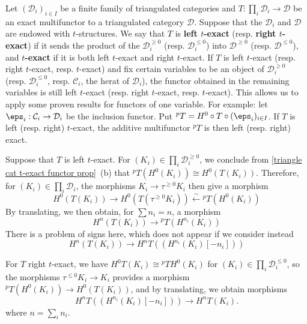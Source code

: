 Let $(\mathcal{D}_i)_{i\in I}$ be a finite family of triangulated categories and $T:\prod_i\mathcal{D}_i\to\mathcal{D}$ be an exact multifunctor to a triangulated category $\mathcal{D}$. Suppose that the $\mathcal{D}_i$ and $\mathcal{D}$ are endowed with $t$-structures. We say that $T$ is \textbf{left $t$-exact} (resp. \textbf{right $t$-exact}) if it sends the product of the $\mathcal{D}_i^{\geq 0}$ (resp. $\mathcal{D}_i^{\leq 0}$) into $\mathcal{D}^{\geq 0}$ (resp. $\mathcal{D}^{\leq 0}$), and \textbf{$t$-exact} if it is both left $t$-exact and right $t$-exact. If $T$ is left $t$-exact (resp. right $t$-exact, resp. $t$-exact) and fix certain variables to be an object of $\mathcal{D}_i^{\geq 0}$ (resp. $\mathcal{D}_i^{\leq 0}$, resp. $\mathcal{C}_i$, the herat of $\mathcal{D}_i$), the functor obtained in the remaining variables is still left $t$-exact (resp. right $t$-exact, resp. $t$-exact). This allows us to apply some proven results for functors of one variable. For example: let $\eps_i:\mathcal{C}_i\to\mathcal{D}_i$ be the inclusion functor. Put ${^pT}=H^0\circ T\circ(\eps_i)_{i\in I}$. If $T$ is left (resp. right) $t$-exact, the additive multifunctor ${^pT}$ is then left (resp. right) exact.\par
Suppose that $T$ is left $t$-exact. For $(K_i)\in\prod_i\mathcal{D}_i^{\geq 0}$, we conclude from \cref{triangle cat t-exact functor prop}~(b) that ${^pT}(H^0(K_i))\cong H^0(T(K_i))$. Therefore, for $(K_i)\in\prod_i\mathcal{D}_i$, the morphisms $K_i\to\tau^{\geq 0}K_i$ then give a morphism
\begin{equation}\label{triangle cat multifunctor t-exact-1}
H^0(T(K_i))\to H^0(T(\tau^{\geq 0}K_i))\stackrel{\sim}{\leftarrow} {^pT}(H^0(K_i))
\end{equation}
By translating, we then obtain, for $\sum n_i=n$, a morphism
\begin{equation}\label{triangle cat multifunctor t-exact-2}
H^n(T(K_i))\to {^pT}(H^{n_i}(K_i))
\end{equation}
There is a problem of signs here, which does not appear if we consider instead
\begin{equation}\label{triangle cat multifunctor t-exact-3}
H^n(T(K_i))\to H^nT((H^{n_i}(K_i)[-n_i]))
\end{equation}

For $T$ right $t$-exact, we have $H^0T(K_i)\cong {^pT}H^0(K_i)$ for $(K_i)\in\prod_i\mathcal{D}_i^{\leq 0}$, so the morphisms $\tau^{\leq 0}K_i\to K_i$ provides a morphism ${^pT}(H^0(K_i))\to H^0(T(K_i))$, and by translating, we obtain morphisms
\begin{equation}\label{triangle cat multifunctor t-exact-4}
H^nT((H^{n_i}(K_i)[-n_i]))\to H^nT(K_i).
\end{equation}
where $n=\sum_in_i$.\par

